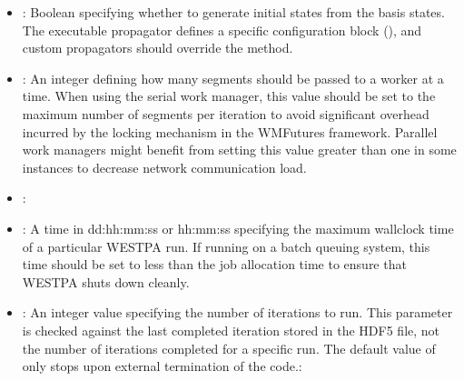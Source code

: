 \documentclass[letterpaper,10pt,english]{sphinxmanual}
\begin{document}
\begin{sphinxVerbatim}[commandchars=\\\{\}]
         
         
         
         
         
\end{sphinxVerbatim}
\begin{itemize}
\item {} 
: Boolean specifying whether to generate initial states from
the basis states. The executable propagator defines a specific configuration
block (), and custom propagators should
override the  method.

\item {} 
: An integer defining how many segments should be passed to a
worker at a time. When using the serial work manager, this value should be
set to the maximum number of segments per iteration to avoid significant
overhead incurred by the locking mechanism in the WMFutures framework.
Parallel work managers might benefit from setting this value greater than one
in some instances to decrease network communication load.

\item {} 
:

\item {} 
: A time in dd:hh:mm:ss or hh:mm:ss specifying the
maximum wallclock time of a particular WESTPA run. If running on a batch
queuing system, this time should be set to less than the job allocation time
to ensure that WESTPA shuts down cleanly.

\item {} 
: An integer value specifying the number of
iterations to run. This parameter is checked against the last completed
iteration stored in the HDF5 file, not the number of iterations completed for
a specific run. The default value of  only stops upon external
termination of the code.:


\end{itemize}
\end{document}
